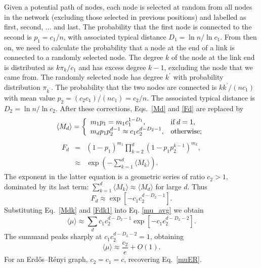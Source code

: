 \documentclass[reprint,aps,pre,amsmath,amssymb,superscriptaddress,showpacs]{revtex4-1}
\begin{document}
Given a potential path of nodes, each node is selected at random from all nodes in the network (excluding those selected in previous positions) and labelled as first, second, ... and last. The probability that the first node is connected to the second is $p_1 = c_1/n$, with associated typical distance $D_1 = \ln n / \ln c_1$. From then on, we need to calculate the probability that a node at the end of a link is connected to a randomly selected node. The degree $k$ of the node at the link end is distributed as $k\pi_k/c_1$ and has excess degree $k-1$, excluding the node that we came from. The randomly selected node has degree $k^\prime$ with probability distribution $\pi_{k^\prime}$. The probability that the two nodes are connected is $kk^\prime/(nc_1)$ with mean value $p_2 = (c_2 c_1) / (n c_1) = c_2 / n$. The associated typical distance is $D_2 = \ln n / \ln c_2$. After these corrections, Eqs.~\eqref{Md} and \eqref{Fd} are replaced by
%
\begin{equation}
\langle M_d\rangle = \left\{
\begin{array}{ll}
m_1 p_1 = m_1 c_1^{1-D_1}, & {\rm if}\,d=1,\\
m_d p_1p_2^{d-1} \approx c_1 c_2^{d - D_2 - 1}, & {\rm otherwise};
\end{array}
\right.
\label{Mdk}
\end{equation}
%
\begin{eqnarray}
F_d &=& (1-p_1)^{m_1}\prod_{k=2}^{d}\left(1- p_1p_2^{k-1}\right)^{m_k}, \nonumber\\
&\approx& \exp\left( - \sum_{k=1}^d \langle M_k\rangle \right).
\label{Fdk}
\end{eqnarray}
%
The exponent in the latter equation is a geometric series of ratio $c_2>1$, dominated by its last term: $\sum_{k=1}^{d}\langle M_k\rangle \approx \langle M_d\rangle$ for large $d$. Thus
%
\begin{equation}
F_d \approx \exp\!\left[ - c_1 c_2^{d - D_2 - 1} \right] .
\label{Fdk1}
\end{equation}
%
Substituting Eq.~\eqref{Mdk} and \eqref{Fdk1} into Eq. \eqref{mu_avg} we obtain
%
\begin{equation}
\langle\mu\rangle \approx \sum_d c_1 c_2^{d - D_2 - 1} 
\exp\!\left[ - c_1 c_2^{d - D_2 - 2} \right].
\label{muk_avg_final}
\end{equation}
%
The summand peaks sharply at $c_1 c_2^{d - D_2 -2} = 1$, obtaining
%
\begin{equation}
\langle\mu\rangle \approx \frac{c_2}{e} + O(1).
\label{muk}
\end{equation}
%
For an Erd\H{o}s--R\'enyi graph, $c_2 = c_1 =c$, recovering Eq.~\eqref{muER}.





%


\end{document}
